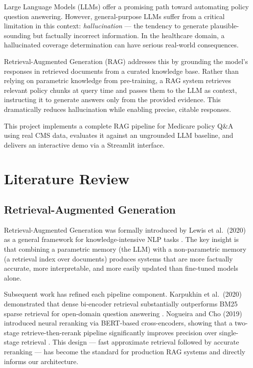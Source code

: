 \documentclass[10pt, letterpaper]{article}
\begin{document}
Large Language Models (LLMs) offer a promising path toward automating policy question
answering. However, general-purpose LLMs suffer from a critical limitation in this
context: \textit{hallucination} --- the tendency to generate plausible-sounding but
factually incorrect information. In the healthcare domain, a hallucinated coverage
determination can have serious real-world consequences.
 
Retrieval-Augmented Generation (RAG) addresses this by grounding the model's responses
in retrieved documents from a curated knowledge base. Rather than relying on parametric
knowledge from pre-training, a RAG system retrieves relevant policy chunks at query time
and passes them to the LLM as context, instructing it to generate answers only from
the provided evidence. This dramatically reduces hallucination while enabling precise,
citable responses.
 
This project implements a complete RAG pipeline for Medicare policy Q\&A using real CMS
data, evaluates it against an ungrounded LLM baseline, and delivers an interactive demo
via a Streamlit interface.
 
\section{Literature Review}
 
\subsection{Retrieval-Augmented Generation}
 
Retrieval-Augmented Generation was formally introduced by Lewis et al.\ (2020) as a
general framework for knowledge-intensive NLP tasks \cite{lewis2020rag}. The key insight
is that combining a parametric memory (the LLM) with a non-parametric memory (a retrieval
index over documents) produces systems that are more factually accurate, more interpretable,
and more easily updated than fine-tuned models alone.
 
Subsequent work has refined each pipeline component. Karpukhin et al.\ (2020) demonstrated
that dense bi-encoder retrieval substantially outperforms BM25 sparse retrieval for
open-domain question answering \cite{karpukhin2020dpr}. Nogueira and Cho (2019) introduced
neural reranking via BERT-based cross-encoders, showing that a two-stage retrieve-then-rerank
pipeline significantly improves precision over single-stage retrieval \cite{nogueira2019reranker}.
This design --- fast approximate retrieval followed by accurate reranking --- has become the
standard for production RAG systems and directly informs our architecture.
 
\end{document}
